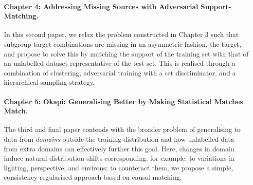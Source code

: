 \paragraph{Chapter 4: Addressing Missing Sources with Adversarial Support-Matching.}
%
In this second paper, we relax the problem constructed in Chapter 3 such that subgroup-target
combinations are missing in an asymmetric fashion, \wrt{} the target, and propose to solve this by
matching the support of the training set with that of an unlabelled dataset representative of the
test set. 
%
This is realised through a combination of clustering, adversarial training with a set
discriminator, and a hierarchical-sampling strategy.
%

\paragraph{Chapter 5: Okapi: Generalising Better by Making Statistical Matches Match.}
%
The third and final paper contends with the broader problem of generalising to data from
\emph{domains} outside the training distribution  and how unlabelled data from extra domains can
effectively further this goal.
%
Here, changes in domain induce natural distribution shifts corresponding, for example, to
variations in lighting, perspective, and environs; to counteract them, we propose a simple,
consistency-regularised approach based on causal matching.

